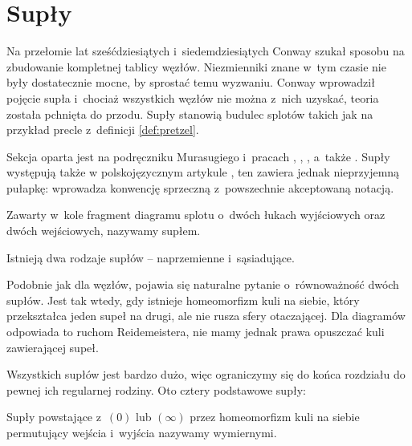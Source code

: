 \section{Supły} %
\label{sec:tangle}

Na przełomie lat sześćdziesiątych i~siedemdziesiątych Conway szukał sposobu na zbudowanie kompletnej tablicy węzłów.
Niezmienniki znane w~tym czasie nie były dostatecznie mocne, by sprostać temu wyzwaniu.
Conway wprowadził pojęcie supła i~chociaż wszystkich węzłów nie można z~nich uzyskać, teoria została pchnięta do przodu.
Supły stanowią budulec splotów takich jak na przykład precle z~definicji \ref{def:pretzel}.

Sekcja oparta jest na podręczniku Murasugiego \cite{murasugi96} i~pracach \cite{conway70}, \cite{kauffman97}, \cite{kauffman04}, a~także \cite{schubert56}.
Supły występują także w polskojęzycznym artykule \cite{janiak04}, ten zawiera jednak nieprzyjemną pułapkę: wprowadza konwencję sprzeczną z~powszechnie akceptowaną notacją.

\begin{definition}[supeł]
    \label{def:tangle}
    Zawarty w~kole fragment diagramu splotu o~dwóch łukach wyjściowych oraz dwóch wejściowych, nazywamy supłem.
\end{definition}

Istnieją dwa rodzaje supłów -- naprzemienne i~sąsiadujące.


Podobnie jak dla węzłów, pojawia się naturalne pytanie o~równoważność dwóch supłów.
Jest tak wtedy, gdy istnieje homeomorfizm kuli na siebie, który przekształca jeden supeł na drugi, ale nie rusza sfery otaczającej.
Dla diagramów odpowiada to ruchom Reidemeistera, nie mamy jednak prawa opuszczać kuli zawierającej supeł.

Wszystkich supłów jest bardzo dużo, więc ograniczymy się do końca rozdziału do pewnej ich regularnej rodziny.
Oto cztery podstawowe supły:


\begin{definition}
    \label{def:rational_tangle}
    Supły powstające z~$(0)$ lub $(\infty)$ przez homeomorfizm kuli na siebie permutujący wejścia i~wyjścia nazywamy wymiernymi.
\end{definition}

